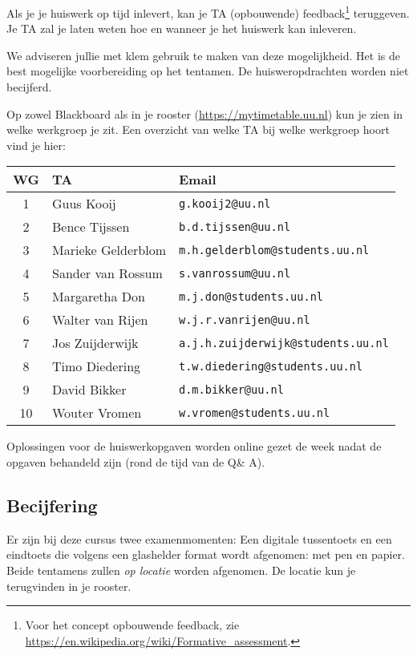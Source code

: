 \documentclass[a4paper,11pt]{article}
\begin{document}
Als je je huiswerk op tijd inlevert, kan je TA (opbouwende) feedback\footnote{Voor het concept opbouwende feedback, zie  \url{https://en.wikipedia.org/wiki/Formative_assessment}.} teruggeven. Je TA zal je laten weten hoe en wanneer je het huiswerk kan inleveren.

We adviseren jullie met klem gebruik te maken van deze mogelijkheid.
Het is de best mogelijke voorbereiding op het tentamen. De huisweropdrachten worden niet becijferd.


Op zowel Blackboard als in je rooster (\url{https://mytimetable.uu.nl}) kun je zien in welke werkgroep je zit.
Een overzicht van welke TA bij welke werkgroep hoort vind je hier:
\begin{center}
\begin{tabular}{| c | l | l |}
\hline
  \textbf{WG} & \textbf{TA} & \textbf{Email}\\\hline
  1& Guus Kooij & \texttt{g.kooij2@uu.nl}\\
  2 & Bence Tijssen & \texttt{b.d.tijssen@uu.nl}\\
  3& Marieke Gelderblom& \texttt{m.h.gelderblom@students.uu.nl}\\
  4 & Sander van Rossum & \texttt{s.vanrossum@uu.nl}\\
  5 & Margaretha Don & \texttt{m.j.don@students.uu.nl}\\
  6 & Walter van Rijen & \texttt{w.j.r.vanrijen@uu.nl}\\
  7& Jos Zuijderwijk & \texttt{a.j.h.zuijderwijk@students.uu.nl}\\
  8 & Timo Diedering & \texttt{t.w.diedering@students.uu.nl}\\
  9 & David Bikker & \texttt{d.m.bikker@uu.nl}\\
  10& Wouter Vromen & \texttt{w.vromen@students.uu.nl}\\\hline
\end{tabular}
\end{center}

Oplossingen voor de huiswerkopgaven worden online gezet de week nadat de opgaven behandeld zijn (rond de tijd van de Q\& A). 

\subsection*{Becijfering}

Er zijn bij deze cursus twee examenmomenten:
Een digitale tussentoets en een eindtoets die volgens een glashelder format wordt afgenomen: met pen en papier. Beide tentamens zullen \emph{op locatie} worden afgenomen. De locatie kun je terugvinden in je rooster.
\end{document}
